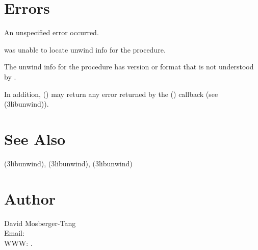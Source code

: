 \documentclass{article}
\begin{document}
\section{Errors}

\begin{Description}
\item[\Const{UNW\_EUNSPEC}] An unspecified error occurred.
\item[\Const{UNW\_ENOINFO}]  was unable to locate
  unwind info for the procedure.
\item[\Const{UNW\_EBADVERSION}] The unwind info for the procedure has
  version or format that is not understood by .
\end{Description}
In addition, () may return any error
returned by the () callback (see
(3libunwind)).

\section{See Also}

(3libunwind),
(3libunwind),
(3libunwind)

\section{Author}

\noindent
David Mosberger-Tang\\
Email: \\
WWW: .
\LatexManEnd
\end{document}
